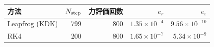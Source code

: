 \begin{tabular}{lrrrr}\toprule
方法 & $N_{\rm step}$ & 力評価回数 & $e_r$ & $e_\varepsilon$ \\
\midrule
Leapfrog (KDK) & 799 & 800 & $1.35\times 10^{-4}$ & $9.56\times 10^{-10}$ \\
RK4 & 200 & 800 & $1.65\times 10^{-7}$ & $5.34\times 10^{-9}$ \\
\bottomrule\end{tabular}
